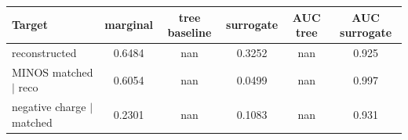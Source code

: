 \begin{tabular}{lccccc}
\toprule
Target & marginal & tree baseline & surrogate & AUC tree & AUC surrogate \\
\midrule
reconstructed & 0.6484 & nan & 0.3252 & nan & 0.925 \\
MINOS matched $\mid$ reco & 0.6054 & nan & 0.0499 & nan & 0.997 \\
negative charge $\mid$ matched & 0.2301 & nan & 0.1083 & nan & 0.931 \\
\bottomrule
\end{tabular}
